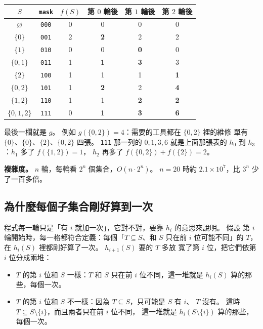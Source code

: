 \begin{center}
\begin{tabular}{cc|c|ccc}
\toprule
$S$ & \texttt{mask} & $f(S)$ & 第 $0$ 輪後 & 第 $1$ 輪後 & 第 $2$ 輪後 \\
\midrule
$\varnothing$ & \texttt{000} & 0 & 0 & 0 & 0 \\
$\{0\}$ & \texttt{001} & 2 & \textbf{2} & 2 & 2 \\
$\{1\}$ & \texttt{010} & 0 & 0 & \textbf{0} & 0 \\
$\{0, 1\}$ & \texttt{011} & 1 & \textbf{1} & \textbf{3} & 3 \\
$\{2\}$ & \texttt{100} & 1 & 1 & 1 & \textbf{1} \\
$\{0, 2\}$ & \texttt{101} & 1 & \textbf{2} & 2 & \textbf{4} \\
$\{1, 2\}$ & \texttt{110} & 1 & 1 & \textbf{2} & \textbf{2} \\
$\{0, 1, 2\}$ & \texttt{111} & 0 & \textbf{1} & \textbf{3} & \textbf{6} \\
\bottomrule
\end{tabular}
\end{center}

最後一欄就是 $g$。 例如 $g(\{0, 2\}) = 4$：需要的工具都在 $\{0, 2\}$ 裡的維修
單有 $\{0\}$、$\{0\}$、$\{2\}$、$\{0, 2\}$ 四張。 \texttt{111} 那一列的
$0, 1, 3, 6$ 就是上面那張表的 $h_0$ 到 $h_3$：$h_1$ 多了 $f(\{1, 2\}) = 1$，
$h_2$ 再多了 $f(\{0, 2\}) + f(\{2\}) = 2$。

\textbf{複雜度。} $n$ 輪，每輪看 $2^n$ 個集合，$O(n \cdot 2^n)$。 $n = 20$
時約 $2.1 \times 10^7$，比 $3^n$ 少了一百多倍。

\subsection{為什麼每個子集合剛好算到一次}
\label{sec:bm-sos-once}

程式每一輪只是「有 $i$ 就加一次」，它對不對，要靠 $h_i$ 的意思來說明。 假設
第 $i$ 輪開始時，每一格都符合定義：每個「$T \subseteq S$、和 $S$ 只在前 $i$
位可能不同」的 $T$，在 $h_i(S)$ 裡都剛好算了一次。 $h_{i+1}(S)$ 要的 $T$ 多放
寬了第 $i$ 位，把它們依第 $i$ 位分成兩堆：

\begin{itemize}
\item $T$ 的第 $i$ 位和 $S$ 一樣：$T$ 和 $S$ 只在前 $i$ 位不同，這一堆就是
$h_i(S)$ 算的那些，每個一次。
\item $T$ 的第 $i$ 位和 $S$ 不一樣：因為 $T \subseteq S$，只可能是 $S$ 有 $i$、
$T$ 沒有。 這時 $T \subseteq S \setminus \{i\}$，而且兩者只在前 $i$ 位不同，
這一堆就是 $h_i(S \setminus \{i\})$ 算的那些，每個一次。
\end{itemize}

